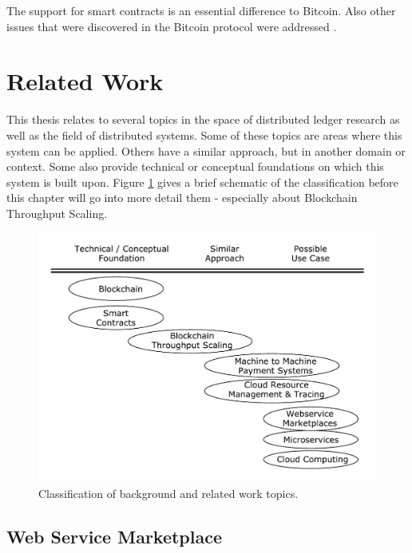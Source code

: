 \documentclass[a4paper,12pt]{scrartcl}
\begin{document}
The support for smart contracts is an essential difference to Bitcoin. Also other issues that were discovered in the Bitcoin protocol were addressed \cite{web8}.

\newpage
\section{Related Work}

This thesis relates to several topics in the space of distributed ledger research as well as the field of distributed systems. Some of these topics are areas where this system can be applied. Others have a similar approach, but in another domain or context. Some also provide technical or conceptual foundations on which this system is built upon. Figure \ref{fig:RelatedWork} gives a brief schematic of the classification before this chapter will go into more detail them - especially about Blockchain Throughput Scaling.

\begin{figure}[H]
\centering
\includegraphics[width=450pt]{Images/RelatedWork.pdf}
\caption{Classification of background and related work topics.}
\label{fig:RelatedWork}
\end{figure}

\subsection{Web Service Marketplace}
\end{document}
